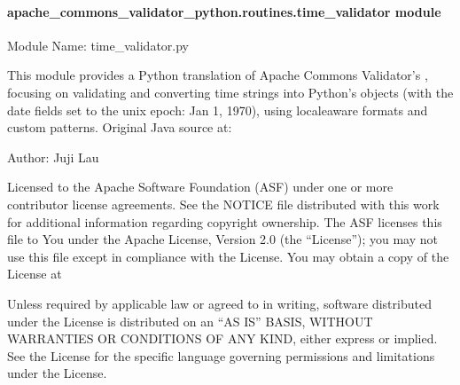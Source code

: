 \documentclass[letterpaper,10pt,english]{sphinxmanual}
\begin{document}
\paragraph{apache\_commons\_validator\_python.routines.time\_validator module}
\label{\detokenize{apache_commons_validator_python.routines:module-apache_commons_validator_python.routines.time_validator}}\label{\detokenize{apache_commons_validator_python.routines:apache-commons-validator-python-routines-time-validator-module}}
\sphinxAtStartPar
Module Name: time\_validator.py
\begin{description}
\sphinxAtStartPar
This module provides a Python translation of Apache Commons Validator’s
, focusing on validating and converting time strings
into Python’s  objects (with the date fields set to the unix epoch: Jan 1, 1970),
using locale\sphinxhyphen{}aware formats and custom patterns.  Original Java source at:
\begin{quote}

\sphinxAtStartPar
{}
\end{quote}

\end{description}

\sphinxAtStartPar
Author: Juji Lau
\begin{description}
\sphinxAtStartPar
Licensed to the Apache Software Foundation (ASF) under one or more
contributor license agreements. See the NOTICE file distributed with
this work for additional information regarding copyright ownership.
The ASF licenses this file to You under the Apache License, Version 2.0
(the “License”); you may not use this file except in compliance with
the License. You may obtain a copy of the License at
\begin{quote}

\sphinxAtStartPar
{}
\end{quote}

\sphinxAtStartPar
Unless required by applicable law or agreed to in writing, software
distributed under the License is distributed on an “AS IS” BASIS,
WITHOUT WARRANTIES OR CONDITIONS OF ANY KIND, either express or implied.
See the License for the specific language governing permissions and
limitations under the License.

\end{description}
\end{document}
